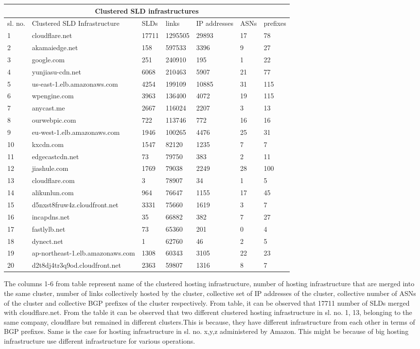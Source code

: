 \begin{tabular}{ |p{1cm}||p{6cm}||p{1cm}||p{1cm}||p{1cm}||p{1cm}||p{1cm}| }
 \hline
 \multicolumn{7}{|c|}{Clustered SLD infrastructures} \\
 \hline
 sl. no.& Clustered SLD Infrastructure    & SLDs & links& IP addresses& ASNs& prefixes\\
 \hline
1&cloudflare.net& 17711& 1295505& 29893& 17 &78\\
2&akamaiedge.net& 158& 597533& 3396& 9 &27\\
3&google.com& 251& 240910& 195& 1&22\\
4&yunjiasu-cdn.net& 6068& 210463& 5907& 21&77\\
5&us-east-1.elb.amazonaws.com& 4254& 199109& 10885& 31&115\\
6&wpengine.com& 3963& 136400& 4072& 19&115\\
7&anycast.me& 2667& 116024& 2207& 3&13\\
8&ourwebpic.com& 722& 113746& 772& 16&16\\
9&eu-west-1.elb.amazonaws.com& 1946& 100265& 4476& 25&31\\
10&kxcdn.com& 1547& 82120& 1235& 7&7\\
11&edgecastcdn.net& 73& 79750& 383& 2&11\\
12&jiashule.com& 1769& 79038& 2249& 28&100\\
13&cloudflare.com& 3& 78907& 34& 1&5\\
14&alikunlun.com& 964& 76647& 1155& 17&45\\
15&d5nxst8fruw4z.cloudfront.net& 3331& 75660& 1619& 3&7\\
16&incapdns.net& 35& 66882& 382& 7&27\\
17&fastlylb.net& 73& 65360& 201& 0&4\\
18&dynect.net& 1& 62760& 46& 2&5\\
19&ap-northeast-1.elb.amazonaws.com& 1308& 60343& 3105& 22&23\\
20&d2t8dj4tr3q9od.cloudfront.net& 2363& 59807& 1316& 8&7\\
\hline
\end{tabular}
\newline

The columns 1-6 from table represent name of the clustered hosting infrastructure, number of hosting infrastructure that are merged into the same cluster, number of links collectively hosted by the cluster, collective set of IP addresses of the cluster, collective number of ASNs of the cluster and collective  BGP prefixes of the cluster respectively.
From table, it can be observed that 17711 number of SLDs merged with cloudflare.net. From the table it can be observed that two different clustered hosting infrastructure in sl. no. 1, 13, belonging to the same company, cloudflare but remained in different clusters.This is because, they have different infrastructure from each other in terms of BGP prefixes. Same is the case for hosting infrastructure in sl. no. x,y,z administered by Amazon. This might be because of big hosting infrastructure use different infrastructure for various operations.


